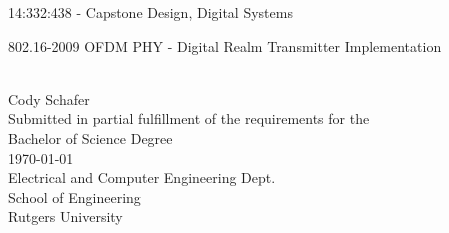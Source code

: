 
\begin{titlepage}
\begin{center}

\vspace*{\fill}

	{14:332:438 - Capstone Design, Digital Systems}	\\
\vspace{5em}
	\begin{huge}{802.16-2009 OFDM PHY - Digital Realm Transmitter Implementation}\end{huge} \\
\vspace{3em}
	{Cody Schafer}  \\
\vspace{10em}
	{\small
		Submitted in partial fulfillment of the requirements for the \\
		Bachelor of Science Degree
	} \\
\vspace{2em}
	{\today} \\
\vspace{2em}
	{\small
		Electrical and Computer Engineering Dept. \\
		School of Engineering \\
		Rutgers University
	}

\vspace*{\fill}
%

\end{center}
\end{titlepage}
